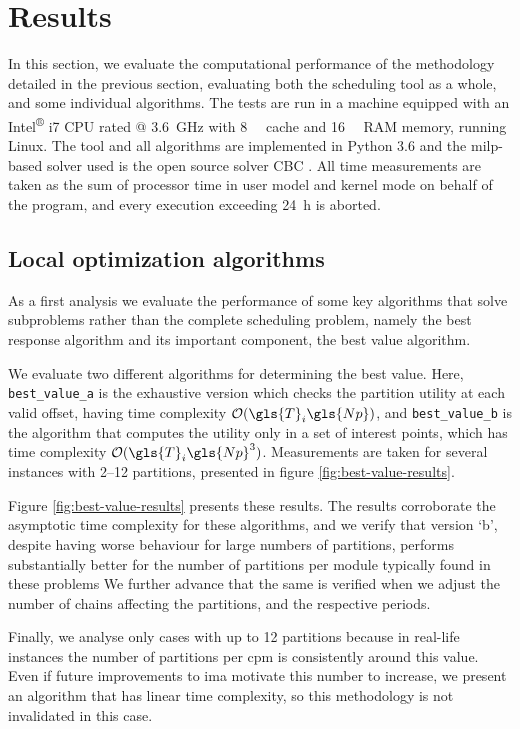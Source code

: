\documentclass[main.tex]{subfiles}
\begin{document}
\section{Results}
\label{sec:results}

In this section, we evaluate the computational performance of the methodology detailed in the previous section, evaluating both the scheduling tool as a whole, and some individual algorithms.
The tests are run in a machine equipped with an Intel\textsuperscript{®} i7 CPU rated @ \SI{3.6}{\giga\hertz} with \SI{8}{\mega\byte} cache and \SI{16}{\giga\byte} RAM memory, running Linux.
The tool and all algorithms are implemented in Python 3.6 and the \gls{milp}-based solver used is the open source solver CBC \cite{cbc-solver}.
All time measurements are taken as the sum of processor time in user model and kernel mode on behalf of the program, and every execution exceeding \SI{24}{\hour} is aborted.

\subsection{Local optimization algorithms}

As a first analysis we evaluate the performance of some key algorithms that solve subproblems rather than the complete scheduling problem, namely the best response algorithm and its important component, the best value algorithm.

We evaluate two different algorithms for determining the best value.
Here, \texttt{best\_value\_a} is the exhaustive version which checks the partition utility at each valid offset, having time complexity $\bigO(\gls{T}_i\gls{Np})$, and \texttt{best\_value\_b} is the algorithm that computes the utility only in a set of interest points, which has time complexity $\bigO(\gls{T}_i\gls{Np}^3)$.
Measurements are taken for several instances with \numrange{2}{12} partitions, presented in figure \ref{fig:best-value-results}.

Figure \ref{fig:best-value-results} presents these results.
The results corroborate the asymptotic time complexity for these algorithms, and we verify that version `b', despite having worse behaviour for large numbers of partitions, performs substantially better for the number of partitions per module typically found in these problems
We further advance that the same is verified when we adjust the number of chains affecting the partitions, and the respective periods.

Finally, we analyse only cases with up to \num{12} partitions because in real-life instances the number of partitions per \gls{cpm} is consistently around this value.
Even if future improvements to \gls{ima} motivate this number to increase, we present an algorithm that has linear time complexity, so this methodology is not invalidated in this case.
\end{document}
